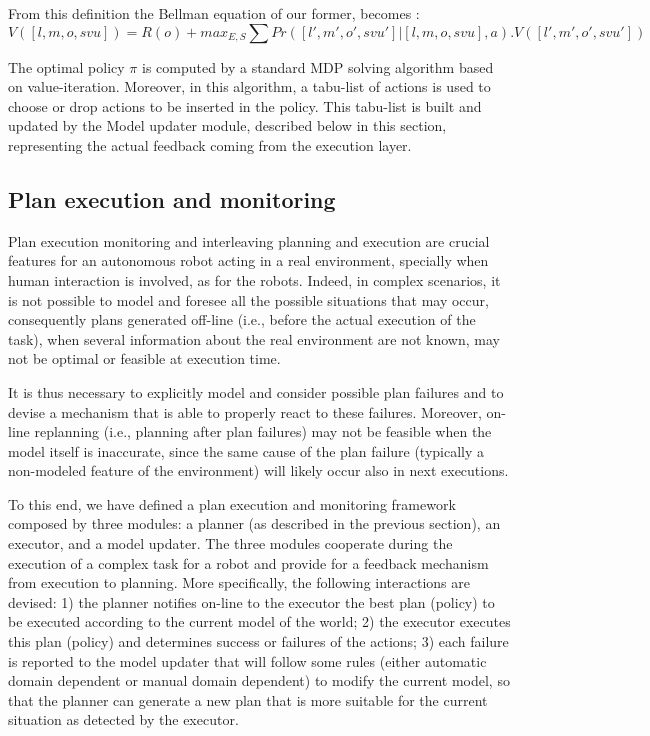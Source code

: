 From this definition the Bellman equation of our former, becomes : 
\[ V([l,m,o,svu]) = R(o) + max_{E,S} \sum Pr([l',m',o',svu'] | [l,m,o,svu], a). V([l',m',o',svu'] )  \]

The optimal policy $\pi$ is computed by a standard MDP solving algorithm based on value-iteration. Moreover, in this algorithm, a tabu-list of actions is used to choose or drop actions to be inserted in the policy.
This tabu-list is built and updated by the Model updater module, described below in this section, representing the actual feedback coming from the execution layer.



\subsection{Plan execution and monitoring}


Plan execution monitoring and interleaving planning and execution are crucial features for an autonomous robot acting in a real environment, specially when human interaction is involved, 
as for the \coaches robots. Indeed, in complex scenarios, it is not possible to model and foresee all the possible situations that may occur, consequently plans generated off-line (i.e., before the actual execution of the task), when several information about the real environment are not known, may not be optimal or feasible at execution time.

It is thus necessary to explicitly model and consider possible plan failures and to devise a mechanism that is able to properly react to these failures. Moreover, on-line replanning (i.e., planning after plan failures) may not be feasible when the model itself is inaccurate, since the same cause of the plan failure (typically a non-modeled feature of the environment) will likely occur also in next executions.

To this end, we have defined a plan execution and monitoring framework composed by three modules: a planner (as described in the previous section), an executor, and a model updater. The three modules cooperate during the execution of a complex task for a robot and provide for a feedback mechanism from execution to planning.
More specifically, the following interactions are devised:
1) the planner notifies on-line to the executor the best plan (policy) to be executed according to the current model of the world; 2) the executor executes this plan (policy) and determines success or failures of the actions; 3) each failure is reported to the model updater that will follow some rules (either automatic domain dependent or manual domain dependent) to modify the current model, so that the planner can generate a new plan that is more suitable for the current situation as detected by the executor.

